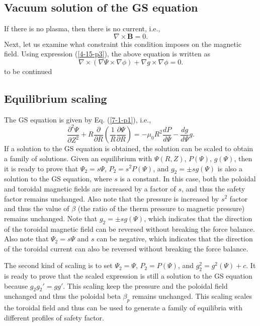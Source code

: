 \documentclass{article}
\begin{document}
\subsection{Vacuum solution of the GS equation}

If there is no plasma, then there is no current, i.e.,
\begin{equation}
  \nabla \times \mathbf{B}= 0.
\end{equation}
Next, let us examine what constraint this condition imposes on the magnetic
field. Using expression (\ref{4-15-p3}), the above equation is written as
\begin{equation}
  \nabla \times (\nabla \Psi \times \nabla \phi) + \nabla g \times \nabla \phi
  = 0.
\end{equation}
to be continued

\subsection{Equilibrium scaling}

The GS equation is given by Eq. (\ref{7-1-p1}), i.e.,
\begin{equation}
  \frac{\partial^2 \Psi}{\partial Z^2} + R \frac{\partial}{\partial R} \left(
  \frac{1}{R} \frac{\partial \Psi}{\partial R} \right) = - \mu_0 R^2 \frac{d
  P}{d \Psi} - \frac{d g}{d \Psi} g.
\end{equation}
If a solution to the GS equation is obtained, the solution can be scaled to
obtain a family of solutions. Given an equilibrium with $\Psi (R, Z)$, $P
(\Psi)$, $g (\Psi)$, then it is ready to prove that $\Psi_2 = s \Psi$, $P_2 =
s^2 P (\Psi)$, and $g_2 = \pm s g (\Psi)$ is also a solution to the GS
equation, where $s$ is a constant. In this case, both the poloidal and
toroidal magnetic fields are increased by a factor of $s$, and thus the safety
factor remains unchanged. Also note that the pressure is increased by $s^2$
factor and thus the value of $\beta$ (the ratio of the therm pressure to
magnetic pressure) remains unchanged. Note that $g_2 = \pm s g (\Psi)$, which
indicates that the direction of the toroidal magnetic field can be reversed
without breaking the force balance. Also note that $\Psi_2 = s \Psi$ and $s$
can be negative, which indicates that the direction of the toroidal current
can also be reversed without breaking the force balance.

The second kind of scaling is to set $\Psi_2 = \Psi$, $P_2 = P (\Psi)$, and
$g^2_2 = g^2 (\Psi) + c$. It is ready to prove that the scaled expression is
still a solution to the GS equation because $g_2 g_2' = g g'$. This scaling
keep the pressure and the poloidal field unchanged and thus the poloidal beta
$\beta_p$ remains unchanged. This scaling scales the toroidal field and thus
can be used to generate a family of equilibria with different profiles of
safety factor.
\end{document}
